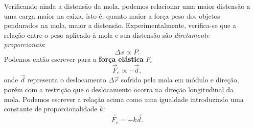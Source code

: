 Verificando ainda a distensão da mola, podemos relacionar uma maior distensão a uma carga maior na caixa, isto é, quanto maior a força peso dos objetos pendurados na mola, maior a distensão. Experimentalmente, verifica-se que a relação entre o peso aplicado à mola e sua distensão são \emph{diretamente proporcionais}:
\begin{equation}
	\Delta x \propto P.
\end{equation}
%
Podemos então escrever para a \textbf{força elástica} $F_e$
\begin{equation}
	\vec{F}_e \propto -\vec{d},
\end{equation}
%
onde $\vec{d}$ representa o deslocamento $\Delta \vec{r}$ sofrido pela mola em módulo e direção, porém com a restrição que o deslocamento ocorra na direção longitudinal da mola. Podemos escrever a relação acima como uma igualdade introduzindo uma constante de proporcionalidade $k$:
\begin{equation}
	\vec{F}_e = -k \vec{d}.
\end{equation}

